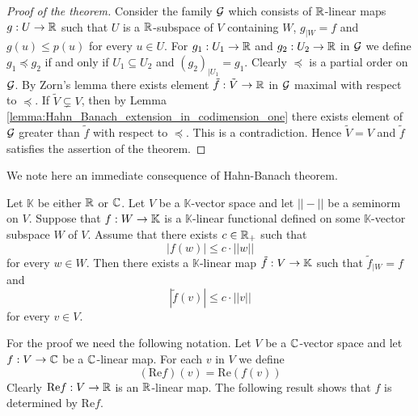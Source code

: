 \begin{proof}[Proof of the theorem]
Consider the family ${\mathcal G}$ which consists of ${\mathbb R}$-linear maps $g:U\rightarrow {\mathbb R}$ such that $U$ is a ${\mathbb R}$-subspace of $V$ containing $W$, $g_{\mid W} = f$ and $g(u) \leq p(u)$ for every $u\in U$. For $g_1:U_1\rightarrow {\mathbb R}$ and $g_2:U_2\rightarrow {\mathbb R}$ in ${\mathcal G}$ we define $g_1\preceq g_2$ if and only if $U_1\subseteq U_2$ and $\left(g_2\right)_{\mid U_1} = g_1$. Clearly $\preceq$ is a partial order on ${\mathcal G}$. By Zorn's lemma there exists element $\tilde{f}:\tilde{V}\rightarrow {\mathbb R}$ in ${\mathcal G}$ maximal with respect to $\preceq$. If $\tilde{V}\subsetneq V$, then by Lemma \ref{lemma:Hahn_Banach_extension_in_codimension_one} there exists element of ${\mathcal G}$ greater than $\tilde{f}$ with respect to $\preceq$. This is a contradiction. Hence $\tilde{V} = V$ and $\tilde{f}$ satisfies the assertion of the theorem.
\end{proof}
\noindent
We note here an immediate consequence of Hahn-Banach theorem. 

\begin{corollary}\label{corollary:seminormed_version_of_hahn_banach_theorem}
Let $\mathbb{K}$ be either ${\mathbb R}$ or ${\mathbb C}$. Let $V$ be a $\mathbb{K}$-vector space and let $||-||$ be a seminorm on $V$. Suppose that $f:W\rightarrow \mathbb{K}$ is a $\mathbb{K}$-linear functional defined on some $\mathbb{K}$-vector subspace $W$ of $V$. Assume that there exists $c\in {\mathbb R}_+$ such that
$$|f(w)| \leq c\cdot ||w||$$
for every $w\in W$. Then there exists a $\mathbb{K}$-linear map $\tilde{f}:V\rightarrow \mathbb{K}$ such that $\tilde{f}_{\mid W} = f$ and 
$$|\tilde{f}(v)| \leq c\cdot ||v||$$
for every $v\in V$.
\end{corollary}
\noindent
For the proof we need the following notation. Let $V$ be a ${\mathbb C}$-vector space and let $f:V\rightarrow {\mathbb C}$ be a ${\mathbb C}$-linear map. For each $v$ in $V$ we define
$$\left(\mathrm{Re}f\right)(v) = \mathrm{Re}\left(f(v)\right)$$
Clearly $\mathrm{Re}f:V\rightarrow {\mathbb R}$ is an ${\mathbb R}$-linear map. The following result shows that $f$ is determined by $\mathrm{Re}f$.

